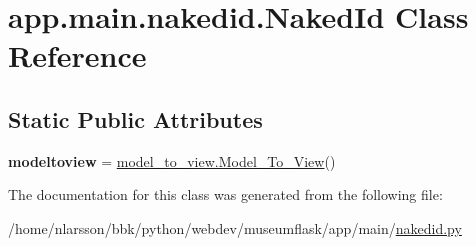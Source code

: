 \hypertarget{classapp_1_1main_1_1nakedid_1_1NakedId}{}\section{app.\+main.\+nakedid.\+Naked\+Id Class Reference}
\label{classapp_1_1main_1_1nakedid_1_1NakedId}
\subsection*{Static Public Attributes}
\begin{DoxyCompactItemize}
\item 
\mbox{\label{classapp_1_1main_1_1nakedid_1_1NakedId_aa100f474e0b55cfd8e2269bc74879fa2}} 
{\bfseries modeltoview} = \mbox{\hyperlink{classapp_1_1main_1_1model__to__view_1_1Model__To__View}{model\+\_\+to\+\_\+view.\+Model\+\_\+\+To\+\_\+\+View}}()
\end{DoxyCompactItemize}


The documentation for this class was generated from the following file\+:\begin{DoxyCompactItemize}
\item 
/home/nlarsson/bbk/python/webdev/museumflask/app/main/\mbox{\hyperlink{nakedid_8py}{nakedid.\+py}}\end{DoxyCompactItemize}
